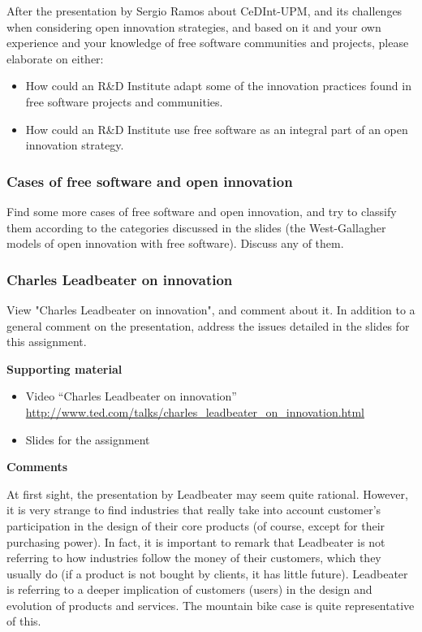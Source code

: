 \documentclass[a4paper]{article}
\begin{document}
After the presentation by Sergio Ramos about CeDInt-UPM, and its challenges when considering open innovation strategies, and based on it and your own experience and your knowledge of free software communities and projects, please elaborate on either:

\begin{itemize}
\item How could an R\&D Institute adapt some of the innovation practices found in free software projects and communities.
\item How could an R\&D Institute use free software as an integral part of an open innovation strategy.
\end{itemize}


\subsubsection{Cases of free software and open innovation}
\label{sub:openinnova-cases}

Find some more cases of free software and open innovation, and try to classify them according to the categories discussed in the slides (the West-Gallagher models of open innovation with free software). Discuss any of them.


\subsubsection{Charles Leadbeater on innovation}
\label{sub:openinnova-leadbater}

View "Charles Leadbeater on innovation", and comment about it. In addition to a general comment on the presentation, address the issues detailed in the slides for this assignment.

\textbf{Supporting material}

\begin{itemize}
\item Video ``Charles Leadbeater on innovation'' \\
  \url{http://www.ted.com/talks/charles_leadbeater_on_innovation.html}
\item Slides for the assignment
\end{itemize}

\textbf{Comments}

At first sight, the presentation by Leadbeater may seem quite rational. However, it is very strange to find industries that really take into account customer's participation in the design of their core products (of course, except for their purchasing power). In fact, it is important to remark that Leadbeater is not referring to how industries follow the money of their customers, which they usually do (if a product is not bought by clients, it has little future). Leadbeater is referring to a deeper implication of customers (users) in the design and evolution of products and services. The mountain bike case is quite representative of this.
\end{document}
